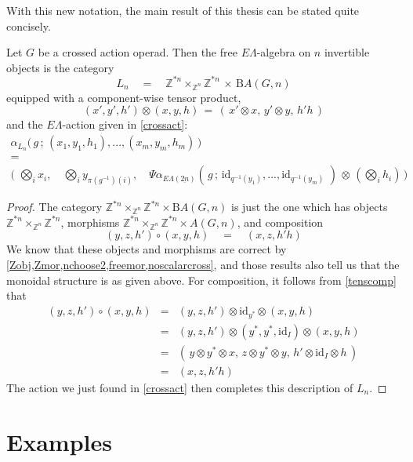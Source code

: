 \documentclass{amsbook} %
\newcommand{\ELnn}{E\Lambda(\underline{2n})}
\numberwithin{section}{chapter}
\begin{document}
With this new notation, the main result of this thesis can be stated quite concisely.

\begin{thm}\label{freeinvalgc} Let $G$ be a crossed action operad. Then the free $E\Lambda$-algebra on $n$ invertible objects is the category
\[ L_n \quad = \quad \mathbb{Z}^{\ast n} \times_{\mathbb{Z}^n} \mathbb{Z}^{\ast n}  \, \times \, \mathrm{B}A(G,n) \]
equipped with a component-wise tensor product,
\[ (x', y' ,h') \otimes (x, y, h) \, = \, ( \, x' \otimes x, \, y' \otimes y, \, h'h \, ) \]
and the $E\Lambda$-action given in \cref{crossact}:
\[ \begin{array}{c}
			\alpha_{L_n}\big( \, g \, ; \, (x_1, y_1, h_1), ..., (x_m, y_m, h_m) \, \big) \\
			= \\
			\big( \, \, \bigotimes_i x_i, \quad \bigotimes_i y_{\pi(g^{-1})(i)}, \quad \Psi \alpha_{\ELnn}( \, g \, ; \, \mathrm{id}_{q^{-1}(y_1)}, ..., \mathrm{id}_{q^{-1}(y_m)} \, \, ) \, \otimes \, (\bigotimes_i h_i) \, \big) 
		\end{array}
\]
\end{thm}
\begin{proof}
The category $\mathbb{Z}^{\ast n} \times_{\mathbb{Z}^n} \mathbb{Z}^{\ast n} \times \mathrm{B}A(G,n)$ is just the one which has objects $\mathbb{Z}^{\ast n} \times_{\mathbb{Z}^n} \mathbb{Z}^{\ast n}$, morphisms $\mathbb{Z}^{\ast n} \times_{\mathbb{Z}^n} \mathbb{Z}^{\ast n} \times A(G,n)$, and composition 
\[ (y, z , h') \circ (x, y, h) \quad = \quad (x, z, h'h) \]
We know that these objects and morphisms are correct by \cref{Zobj,Zmor,nchoose2,freemor,noscalarcross}, and those results also tell us that the monoidal structure is as given above. For composition, it follows from \cref{tenscomp} that
\[ \begin{array}{rll} 
			(y, z , h') \circ (x, y, h) & = & (y, z , h') \otimes \mathrm{id}_{y^*} \otimes (x, y, h) \\
			& = & (y, z , h') \otimes (y^*, y^*, \mathrm{id}_I) \otimes (x, y, h) \\
			& = & (\, y \otimes y^* \otimes x, \,  z \otimes y^* \otimes y, \, h' \otimes \mathrm{id}_I \otimes h \, ) \\
			& = & (x, z, h'h)
		\end{array}
\]
The action we just found in \cref{crossact} then completes this description of $L_n$.
\end{proof}

\chapter{Examples}
\end{document}
